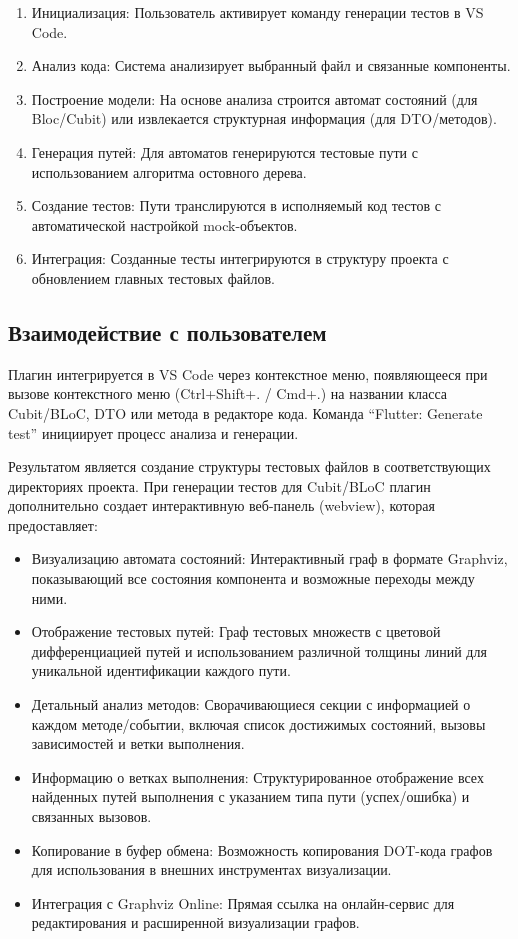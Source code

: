 \documentclass[14pt, russian]{scrartcl}
\newcommand{\enq}[1]{\enquote{#1}}
\begin{document}
\begin{enumerate}
    \item Инициализация: Пользователь активирует команду генерации тестов в VS Code.
    \item Анализ кода: Система анализирует выбранный файл и связанные компоненты.
    \item Построение модели: На основе анализа строится автомат состояний (для Bloc/Cubit) или извлекается структурная информация (для DTO/методов).
    \item Генерация путей: Для автоматов генерируются тестовые пути с использованием алгоритма остовного дерева.
    \item Создание тестов: Пути транслируются в исполняемый код тестов с автоматической настройкой mock-объектов.
    \item Интеграция: Созданные тесты интегрируются в структуру проекта с обновлением главных тестовых файлов.
\end{enumerate}

\subsection{Взаимодействие с пользователем}
Плагин интегрируется в VS Code через контекстное меню, появляющееся при вызове контекстного меню (Ctrl+Shift+. / Cmd+.) на названии класса Cubit/BLoC, DTO или метода в редакторе кода. Команда \enq{Flutter: Generate test} инициирует процесс анализа и генерации. 

Результатом является создание структуры тестовых файлов в соответствующих директориях проекта. При генерации тестов для Cubit/BLoC плагин дополнительно создает интерактивную веб-панель (webview), которая предоставляет:

\begin{itemize}
    \item Визуализацию автомата состояний: Интерактивный граф в формате Graphviz, показывающий все состояния компонента и возможные переходы между ними.
    \item Отображение тестовых путей: Граф тестовых множеств с цветовой дифференциацией путей и использованием различной толщины линий для уникальной идентификации каждого пути.
    \item Детальный анализ методов: Сворачивающиеся секции с информацией о каждом методе/событии, включая список достижимых состояний, вызовы зависимостей и ветки выполнения.
    \item Информацию о ветках выполнения: Структурированное отображение всех найденных путей выполнения с указанием типа пути (успех/ошибка) и связанных вызовов.
    \item Копирование в буфер обмена: Возможность копирования DOT-кода графов для использования в внешних инструментах визуализации.
    \item Интеграция с Graphviz Online: Прямая ссылка на онлайн-сервис для редактирования и расширенной визуализации графов.
\end{itemize}
\end{document}
